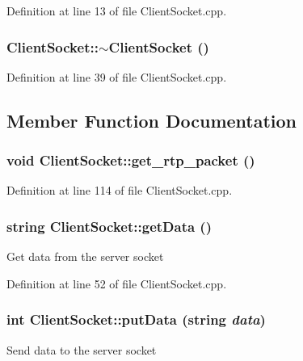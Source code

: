 Definition at line 13 of file ClientSocket.cpp.

\hypertarget{class_client_socket_aef5d9c1c9b443124b820521276b175ca}{
\subsubsection[{$\sim$ClientSocket}]{\setlength{\rightskip}{0pt plus 5cm}ClientSocket::$\sim$ClientSocket ()}}
\label{class_client_socket_aef5d9c1c9b443124b820521276b175ca}


Definition at line 39 of file ClientSocket.cpp.



\subsection{Member Function Documentation}
\hypertarget{class_client_socket_aa7e55da151341ab75642fc4d14900544}{
\subsubsection[{get\_\-rtp\_\-packet}]{\setlength{\rightskip}{0pt plus 5cm}void ClientSocket::get\_\-rtp\_\-packet ()}}
\label{class_client_socket_aa7e55da151341ab75642fc4d14900544}


Definition at line 114 of file ClientSocket.cpp.

\hypertarget{class_client_socket_a0cd1d7163ff77295551111a7ecc9dcbe}{
\subsubsection[{getData}]{\setlength{\rightskip}{0pt plus 5cm}string ClientSocket::getData ()}}
\label{class_client_socket_a0cd1d7163ff77295551111a7ecc9dcbe}
Get data from the server socket 

Definition at line 52 of file ClientSocket.cpp.

\hypertarget{class_client_socket_a4ed02d18f6a81b33c257f2e07d519605}{
\subsubsection[{putData}]{\setlength{\rightskip}{0pt plus 5cm}int ClientSocket::putData (string {\em data})}}
\label{class_client_socket_a4ed02d18f6a81b33c257f2e07d519605}
Send data to the server socket 

